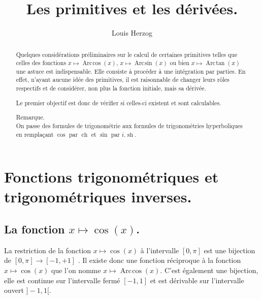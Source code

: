 \documentclass[a4paper,12pt]{report}
\newcommand{\sommaire}{\shorttoc{Sommaire}{1}}
\renewcommand{\sinh}{\mathop{\mathrm{sh}}}
\renewcommand{\cosh}{\mathop{\mathrm{ch}}}
\renewcommand{\arcsin}{\mathop{\mathrm{Arc\mspace{2mu}sin}}}
\renewcommand{\arccos}{\mathop{\mathrm{Arc\mspace{2mu}cos}}}
\renewcommand{\arctan}{\mathop{\mathrm{Arc\mspace{2mu}tan}}}
\begin{document}
 


\setlength{\parindent}{0pt}



\title{Les primitives et les dérivées.}
\date{}


\author{Louis Herzog} 

\maketitle 

\setcounter{tocdepth}{2}
\tableofcontents


\begin{abstract}
Quelques considérations préliminaires sur le calcul de certaines primitives telles que celles des fonctions 
 $x \mapsto \arccos(x) $,  $x \mapsto \arcsin(x) $ ou bien $x \mapsto \arctan(x) $ une astuce est indispensable. Elle consiste à procéder à une intégration par parties. En effet, n'ayant aucune idée des primitives, il est raisonnable de changer leurs rôles respectifs et de considérer, non plus la fonction initiale, mais sa dérivée.
 
Le premier objectif est donc de vérifier si celles-ci existent et sont calculables.

Remarque.\\
On passe des formules de trigonométrie aux formules de trigonométries hyperboliques en remplaçant $\cos$ par $\cosh$ et $\sin$ par $i . \sinh$.


\end{abstract} 

\chapter{Fonctions trigonométriques et trigonométriques inverses.}


\section{La fonction  $x \mapsto \cos(x)$.}

La restriction de la fonction $x \mapsto \cos(x) $ à l'intervalle $[0,\pi]$ est une bijection de $[0,\pi] \rightarrow [-1,+1]$ . Il existe donc une fonction réciproque à la fonction $x \mapsto \cos(x) $ que l'on nomme $x \mapsto \arccos(x) $. C'est également une bijection, elle est continue sur l'intervalle fermé  $ [-1,1]$ et est dérivable sur l'intervalle ouvert $ ]-1,1[$.
\end{document}
